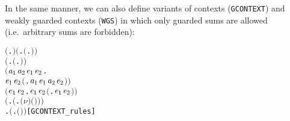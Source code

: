 In the same manner, we can also define variants of contexts (\texttt{GCONTEXT}) and weakly guarded
contexts (\texttt{WGS}) in which only guarded sums are allowed (i.e.~arbitrary sums are forbidden):
\begin{alltt}
\HOLTokenTurnstile{}  \ensuremath{(}\HOLTokenLambda{}. \ensuremath{)} \HOLSymConst{\HOLTokenConj{}} \ensuremath{(}\HOLSymConst{\HOLTokenForall{}}.  \ensuremath{(}\HOLTokenLambda{}. \ensuremath{)}\ensuremath{)} \HOLSymConst{\HOLTokenConj{}}
   \ensuremath{(}\HOLSymConst{\HOLTokenForall{}} .   \HOLSymConst{\HOLTokenImp{}}  \ensuremath{(}\HOLTokenLambda{}. \HOLSymConst{\ensuremath{\ldotp}} \ensuremath{)}\ensuremath{)} \HOLSymConst{\HOLTokenConj{}}
   \ensuremath{(}\HOLSymConst{\HOLTokenForall{}}\ensuremath{\HOLBoundVar{a}\sb{\mathrm{1}}} \ensuremath{\HOLBoundVar{a}\sb{\mathrm{2}}} \ensuremath{\HOLBoundVar{e}\sb{\mathrm{1}}} \ensuremath{\HOLBoundVar{e}\sb{\mathrm{2}}}.
         \ensuremath{\HOLBoundVar{e}\sb{\mathrm{1}}} \HOLSymConst{\HOLTokenConj{}}  \ensuremath{\HOLBoundVar{e}\sb{\mathrm{2}}} \HOLSymConst{\HOLTokenImp{}}  \ensuremath{(}\HOLTokenLambda{}. \ensuremath{\HOLBoundVar{a}\sb{\mathrm{1}}}\HOLSymConst{\ensuremath{\ldotp}}\ensuremath{\HOLBoundVar{e}\sb{\mathrm{1}}}  \HOLSymConst{\ensuremath{+}} \ensuremath{\HOLBoundVar{a}\sb{\mathrm{2}}}\HOLSymConst{\ensuremath{\ldotp}}\ensuremath{\HOLBoundVar{e}\sb{\mathrm{2}}} \ensuremath{)}\ensuremath{)} \HOLSymConst{\HOLTokenConj{}}
   \ensuremath{(}\HOLSymConst{\HOLTokenForall{}}\ensuremath{\HOLBoundVar{e}\sb{\mathrm{1}}} \ensuremath{\HOLBoundVar{e}\sb{\mathrm{2}}}.  \ensuremath{\HOLBoundVar{e}\sb{\mathrm{1}}} \HOLSymConst{\HOLTokenConj{}}  \ensuremath{\HOLBoundVar{e}\sb{\mathrm{2}}} \HOLSymConst{\HOLTokenImp{}}  \ensuremath{(}\HOLTokenLambda{}. \ensuremath{\HOLBoundVar{e}\sb{\mathrm{1}}}  \HOLSymConst{\ensuremath{\mid}} \ensuremath{\HOLBoundVar{e}\sb{\mathrm{2}}} \ensuremath{)}\ensuremath{)} \HOLSymConst{\HOLTokenConj{}}
   \ensuremath{(}\HOLSymConst{\HOLTokenForall{}} .   \HOLSymConst{\HOLTokenImp{}}  \ensuremath{(}\HOLTokenLambda{}. \ensuremath{(\nu}\ensuremath{)} \ensuremath{(} \ensuremath{)}\ensuremath{)}\ensuremath{)} \HOLSymConst{\HOLTokenConj{}}
   \HOLSymConst{\HOLTokenForall{}} .   \HOLSymConst{\HOLTokenImp{}}  \ensuremath{(}\HOLTokenLambda{}.  \ensuremath{(} \ensuremath{)} \ensuremath{)}\hfill{[GCONTEXT_rules]}
\end{alltt}
